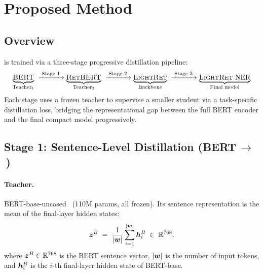 \section{Proposed Method}
\label{sec:method}

\subsection{Overview}

\LightRet{} is trained via a three-stage progressive distillation pipeline:
\[
  \underbrace{\textsc{BERT}}_{\text{Teacher}_1}
  \;\xrightarrow{\;\text{Stage 1}\;}
  \underbrace{\textsc{RetBERT}{}}_{\text{Teacher}_2}
  \;\xrightarrow{\;\text{Stage 2}\;}
  \underbrace{\textsc{LightRet}{}}_{\text{Backbone}}
  \;\xrightarrow{\;\text{Stage 3}\;}
  \underbrace{\textsc{LightRet}{}\text{-NER}}_{\text{Final model}}
\]
Each stage uses a frozen teacher to supervise a smaller student via a
task-specific distillation loss, bridging the representational gap between the
full BERT encoder and the final compact model progressively.

\subsection{Stage 1: Sentence-Level Distillation
            (\textsc{BERT}\,$\to$\,\RetBERT{})}
\label{subsec:stage1}

\paragraph{Teacher.}
BERT-base-uncased~\citep{devlin2019bert} (110M params, all frozen).
Its sentence representation is the mean of the final-layer hidden states:
\begin{equation}
  \bm{z}^{B} \;=\; \frac{1}{|\bm{w}|}\sum_{i=1}^{|\bm{w}|} \bm{h}^{B}_{i}
  \;\in\; \mathbb{R}^{768}.
  \label{eq:bert_sent}
\end{equation}
\noindent where $\bm{z}^{B} \in \mathbb{R}^{768}$ is the BERT sentence vector, $|\bm{w}|$ is the number of input tokens, and $\bm{h}^{B}_{i}$ is the $i$-th final-layer hidden state of BERT-base.

